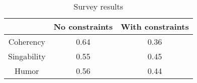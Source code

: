 \begin{table}[]
\centering
\begin{tabular}{|c|c|c|}
\hline
 & No constraints & With constraints \\
\hline
Coherency & 0.64 & 0.36 \\
Singability & 0.55 & 0.45 \\
Humor & 0.56 & 0.44 \\
\hline
\end{tabular}
\caption{Survey results}
\end{table}
